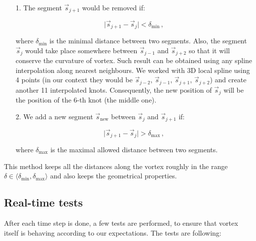 \begin{itemize}
	\item[1.] The segment $\vec{s}_{j+1}$ would be removed if:

	\begin{equation}
	\vert \vec{s}_{j+1} - \vec{s}_j \vert < \delta_{\text{min}}\,,
	\end{equation}

	where $\delta_{\text{min}}$ is the minimal distance between two segments. Also, the segment $\vec{s}_j$ would take place somewhere between $\vec{s}_{j-1}$ and $\vec{s}_{j+2}$ so that it will conserve the curvature of vortex. Such result can be obtained using any spline interpolation along nearest neighbours. We worked with 3D local spline using 4 points (in our context they would be $\vec{s}_{j-2}$, $\vec{s}_{j-1}$, $\vec{s}_{j+1}$, $\vec{s}_{j+2}$) and create another 11 interpolated knots.
	Consequently, the new position of $\vec{s}_j$ will be the position of the 6-th knot (the middle one).

	\item[2.] We add a new segment $\vec{s}_{\text{new}}$ between $\vec{s}_{j}$ and $\vec{s}_{j+1}$ if:

	\begin{equation}
	\vert \vec{s}_{j+1} - \vec{s}_j \vert > \delta_{\text{max}}\,,
	\end{equation}

	where $\delta_{\text{max}}$ is the maximal allowed distance between two segments.
\end{itemize}

This method keeps all the distances along the vortex roughly in the range $\delta \in \langle \delta_{\text{min}}, \delta_{\text{max}} \rangle$ and also keeps the geometrical properties.

\subsection*{Real-time tests}

After each time step is done, a few tests are performed, to ensure that vortex itself is behaving according to our expectations. The tests are following:

